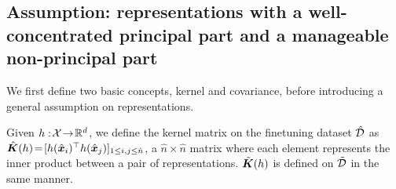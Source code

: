 



\subsection{{Assumption: representations with a well-concentrated principal part
and a manageable non-principal part}}\label{subsec: assump}



We first define two basic concepts, kernel and covariance, before introducing a general assumption on representations.

\begin{definition}
Given $h:\!{\mathcal{X}}\!\rightarrow\! {\mathbb{R}}^d $, we define the kernel matrix on the finetuning dataset $\hat{{\mathcal{D}}}$ as $\hat{{\bm{K}}}(h)\!=\![ h(\hat{{\bm{x}}}_i)^\top h(\hat{{\bm{x}}}_j) ]_{1\leq i,j\leq \hat{n}}$, a $\hat{n}\times\hat{n}$ matrix where each element represents the inner product between a pair of representations. $\tilde{{\bm{K}}}(h)$ is defined on $\tilde{{\mathcal{D}}}$ in the same manner.
\end{definition}


